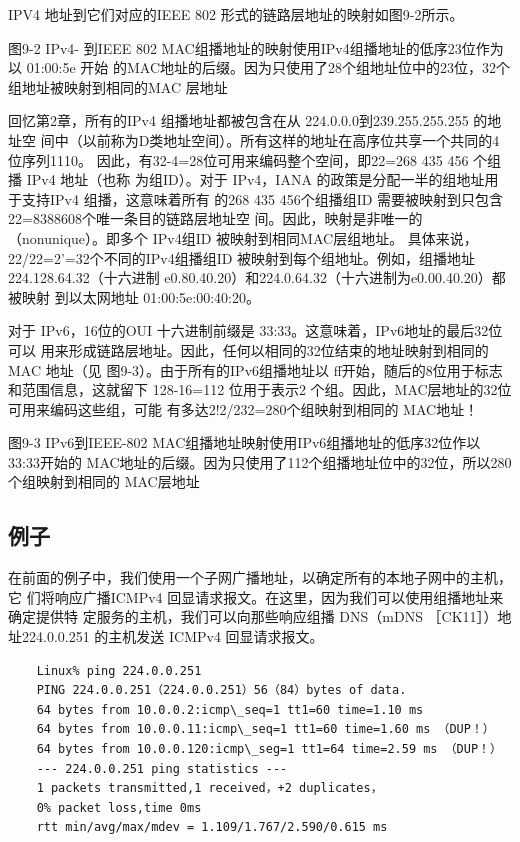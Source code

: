 IPV4 地址到它们对应的IEEE 802 形式的链路层地址的映射如图9-2所示。

图9-2 IPv4- 到IEEE 802 MAC组播地址的映射使用IPv4组播地址的低序23位作为以 01:00:5e 开始
的MAC地址的后缀。因为只使用了28个组地址位中的23位，32个组地址被映射到相同的MAC 层地址

回忆第2章，所有的IPv4 组播地址都被包含在从 224.0.0.0到239.255.255.255 的地址空
间中（以前称为D类地址空间）。所有这样的地址在高序位共享一个共同的4位序列1110。
因此，有32-4=28位可用来编码整个空间，即22=268 435 456 个组播 IPv4 地址（也称
为组ID）。对于 IPv4，IANA 的政策是分配一半的组地址用于支持IPv4 组播，这意味着所有
的268 435 456个组播组ID 需要被映射到只包含22=8388608个唯一条目的链路层地址空
间。因此，映射是非唯一的（nonunique）。即多个 IPv4组ID 被映射到相同MAC层组地址。
具体来说，22/22=2’=32个不同的IPv4组播组ID 被映射到每个组地址。例如，组播地址
224.128.64.32（十六进制 e0.80.40.20）和224.0.64.32（十六进制为e0.00.40.20）都被映射
到以太网地址 01:00:5e:00:40:20。

对于 IPv6，16位的OUI 十六进制前缀是 33:33。这意味着，IPv6地址的最后32位可以
用来形成链路层地址。因此，任何以相同的32位结束的地址映射到相同的MAC 地址（见
图9-3）。由于所有的IPv6组播地址以 ff开始，随后的8位用于标志和范围信息，这就留下
128-16=112 位用于表示2 个组。因此，MAC层地址的32位可用来编码这些组，可能
有多达2!2/232=280个组映射到相同的 MAC地址！

图9-3 IPv6到IEEE-802 MAC组播地址映射使用IPv6组播地址的低序32位作以33:33开始的
MAC地址的后缀。因为只使用了112个组播地址位中的32位，所以280个组映射到相同的
MAC层地址

\subsection{例子}
在前面的例子中，我们使用一个子网广播地址，以确定所有的本地子网中的主机，它
们将响应广播ICMPv4 回显请求报文。在这里，因为我们可以使用组播地址来确定提供特
定服务的主机，我们可以向那些响应组播 DNS（mDNS ［CK11］）地址224.0.0.251 的主机发送
ICMPv4 回显请求报文。

\begin{verbatim}
    Linux% ping 224.0.0.251
    PING 224.0.0.251（224.0.0.251）56（84）bytes of data.
    64 bytes from 10.0.0.2:icmp\_seq=1 tt1=60 time=1.10 ms
    64 bytes from 10.0.0.11:icmp\_seq=1 tt1=60 time=1.60 ms （DUP！）
    64 bytes from 10.0.0.120:icmp\_seg=1 tt1=64 time=2.59 ms （DUP！）
    --- 224.0.0.251 ping statistics ---
    1 packets transmitted,1 received，+2 duplicates，
    0% packet loss,time 0ms
    rtt min/avg/max/mdev = 1.109/1.767/2.590/0.615 ms
\end{verbatim}

